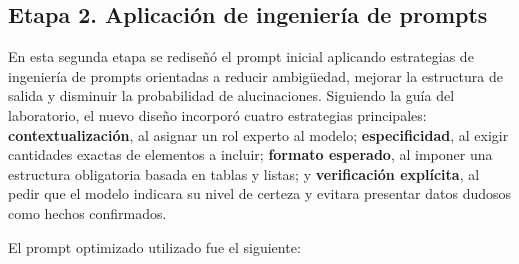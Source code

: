 \documentclass[11pt,a4paper]{article}
\begin{document}
\subsection{Etapa 2. Aplicación de ingeniería de prompts}

En esta segunda etapa se rediseñó el prompt inicial aplicando estrategias de ingeniería de prompts orientadas a reducir ambigüedad, mejorar la estructura de salida y disminuir la probabilidad de alucinaciones. Siguiendo la guía del laboratorio, el nuevo diseño incorporó cuatro estrategias principales: \textbf{contextualización}, al asignar un rol experto al modelo; \textbf{especificidad}, al exigir cantidades exactas de elementos a incluir; \textbf{formato esperado}, al imponer una estructura obligatoria basada en tablas y listas; y \textbf{verificación explícita}, al pedir que el modelo indicara su nivel de certeza y evitara presentar datos dudosos como hechos confirmados.

El prompt optimizado utilizado fue el siguiente:
\end{document}
